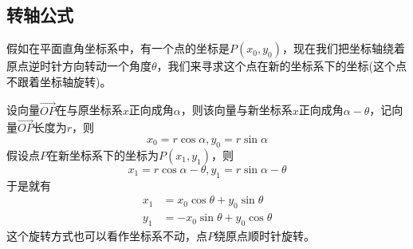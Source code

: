 \subsection{转轴公式}
\label{sec:codinatie-axias-rotation}
假如在平面直角坐标系中，有一个点的坐标是$P(x_0,y_0)$，现在我们把坐标轴绕着原点逆时针方向转动一个角度$\theta$，我们来寻求这个点在新的坐标系下的坐标(这个点不跟着坐标轴旋转)。

设向量$\overrightarrow{OP}$在与原坐标系$x$正向成角$\alpha$，则该向量与新坐标系$x$正向成角$\alpha-\theta$，记向量$\overrightarrow{OP}$长度为$r$，则
\begin{equation*}
  x_0=r\cos{\alpha},y_0=r\sin{\alpha}
\end{equation*}
假设点$P$在新坐标系下的坐标为$P(x_1,y_1)$，则
\begin{equation*}
  x_1=r\cos{\alpha-\theta},y_1=r\sin{\alpha-\theta}
\end{equation*}
于是就有
\begin{equation}
  \label{eq:formulas-rotation-axias}
  \begin{split}
  x_1 & = x_0\cos{\theta} + y_0\sin{\theta} \\
  y_1 & = -x_0\sin{\theta} + y_0\cos{\theta}
  \end{split}
\end{equation}
这个旋转方式也可以看作坐标系不动，点$P$绕原点顺时针旋转。



